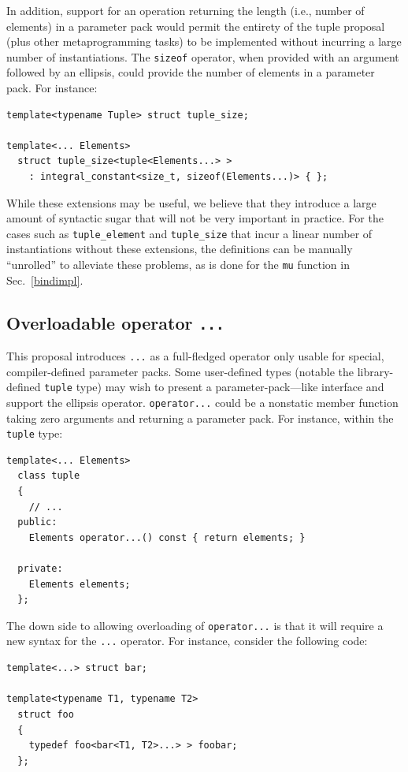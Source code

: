 \documentclass{article}
\begin{document}
In addition, support for an operation returning the length (i.e.,
number of elements) in a parameter pack would permit the entirety of
the tuple proposal~\cite{Jarvi02} (plus other metaprogramming tasks)
to be implemented without incurring a large number of
instantiations. The \texttt{sizeof} operator, when provided with an
argument followed by an ellipsis, could provide the number of elements
in a parameter pack. For instance:

\begin{verbatim}
template<typename Tuple> struct tuple_size;

template<... Elements>
  struct tuple_size<tuple<Elements...> > 
    : integral_constant<size_t, sizeof(Elements...)> { };
\end{verbatim}

While these extensions may be useful, we believe that they introduce a
large amount of syntactic sugar that will not be very important in
practice. For the cases such as \texttt{tuple\_element} and
\texttt{tuple\_size} that incur a linear number of instantiations
without these extensions, the definitions can be manually ``unrolled''
to alleviate these problems, as is done for the \texttt{mu} function
in Sec.~\ref{bindimpl}.

\subsection{Overloadable operator \texttt{...}}
This proposal introduces \texttt{...} as a full-fledged operator only
usable for special, compiler-defined parameter packs. Some
user-defined types (notable the library-defined \texttt{tuple} type)
may wish to present a parameter-pack---like interface and support the
ellipsis operator. \texttt{operator...} could be a nonstatic member
function taking zero arguments and returning a parameter pack. For
instance, within the \texttt{tuple} type:

\begin{verbatim}
template<... Elements>
  class tuple 
  {
    // ...
  public:
    Elements operator...() const { return elements; }

  private:
    Elements elements;
  };
\end{verbatim}

The down side to allowing overloading of \texttt{operator...} is that
it will require a new syntax for the \texttt{...} operator. For
instance, consider the following code:

\begin{verbatim}
template<...> struct bar;

template<typename T1, typename T2>
  struct foo
  {
    typedef foo<bar<T1, T2>...> > foobar;
  };
\end{verbatim}
\end{document}
